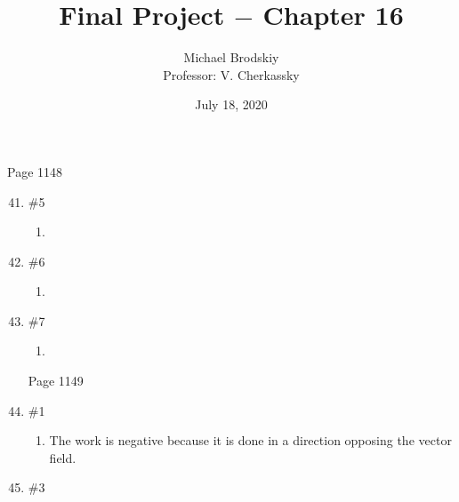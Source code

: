 \documentclass[12pt]{article}
\title{Final Project $-$ Chapter 16}
\date{July 18, 2020}
\author{Michael Brodskiy\\ \small Professor: V. Cherkassky}
\begin{document}
\maketitle

\begin{center}

Page 1148

\end{center}

\begin{enumerate}

\setcounter{enumi}{40}

  \item \#5 \begin{enumerate}

      \item  

    \end{enumerate}

  \item \#6 \begin{enumerate}

      \item 

    \end{enumerate}


    \item \#7

    \begin{enumerate}

      \item 
      
    \end{enumerate}

\begin{center}

Page 1149

\end{center}

    \item \#1 \begin{enumerate}

        \item The work is negative because it is done in a direction opposing the vector field.

\end{enumerate}

    \item \#3 \begin{enumerate}

        \item The work is as follows:
          $$\int_0^{\pi} 9\cos^2(t)\sin(t)\sqrt{10}\,dt$$
          $$u=\cos(t)\Longrightarrow du=-\sin(t)dt$$
          $$-\int_1^{-1}9u^2\sqrt{10} $$
          $$-\sqrt{10}(3u^3\Big|_1^{-1})\Longrightarrow -\sqrt{10}(-6)$$
          $$6\sqrt{10$$


\end{enumerate}
\end{enumerate}
\end{document}
